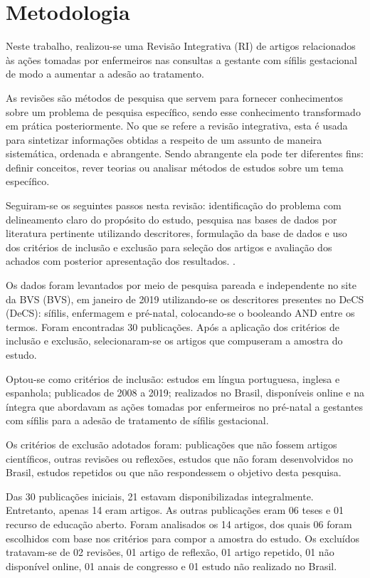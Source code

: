 \chapter{Metodologia}
\label{chap:metodologia}

Neste trabalho, realizou-se uma Revisão Integrativa (\acrshort{RI}) de artigos relacionados às ações tomadas por enfermeiros nas consultas a gestante com sífilis gestacional de modo a aumentar a adesão ao tratamento.

As revisões são métodos de pesquisa que servem para fornecer conhecimentos sobre um problema de pesquisa específico, sendo esse conhecimento transformado em prática posteriormente. No que se refere a revisão integrativa, esta é usada para sintetizar informações obtidas a respeito de um assunto de maneira sistemática, ordenada e abrangente. Sendo abrangente ela pode ter diferentes fins: definir conceitos, rever teorias ou analisar métodos de estudos sobre um tema específico. \cite{mendes2005revisao}

Seguiram-se os seguintes passos nesta revisão: identificação do problema com delineamento claro do propósito do estudo, pesquisa nas bases de dados por literatura pertinente utilizando descritores, formulação da base de dados e uso dos critérios de inclusão e exclusão para seleção dos artigos e avaliação dos achados com posterior apresentação dos resultados. \cite[p. 04]{teixeira2014integrative}.

Os dados foram levantados por meio de pesquisa pareada e independente no site da \acrshort{BVS} (\acrlong{BVS}), em janeiro de 2019 utilizando-se os descritores presentes no \acrshort{DeCS} (\acrlong{DeCS}): sífilis, enfermagem e pré-natal, colocando-se o booleando AND entre os termos. Foram encontradas 30 publicações. Após a aplicação dos critérios de inclusão e exclusão, selecionaram-se os artigos que compuseram a amostra do estudo.

Optou-se como critérios de inclusão: estudos em língua portuguesa, inglesa e espanhola; publicados de 2008 a 2019; realizados no Brasil, disponíveis online e na íntegra que abordavam as ações tomadas por enfermeiros no pré-natal a gestantes com sífilis para a adesão de tratamento de sífilis gestacional. 

Os critérios de exclusão adotados foram: publicações que não fossem artigos científicos, outras revisões ou reflexões, estudos que não foram desenvolvidos no Brasil, estudos repetidos ou que não respondessem o objetivo desta pesquisa. 

Das 30 publicações iniciais, 21 estavam disponibilizadas integralmente. Entretanto,  apenas 14 eram artigos. As outras publicações eram 06 teses e 01 recurso de educação aberto. Foram analisados os 14 artigos, dos quais 06 foram escolhidos com base nos critérios para compor a amostra do estudo. Os excluídos tratavam-se de 02 revisões, 01 artigo de reflexão, 01 artigo repetido, 01 não disponível online, 01 anais de congresso e 01 estudo não realizado no Brasil. 

